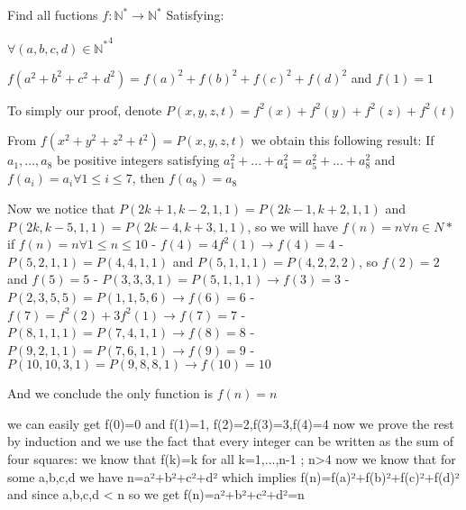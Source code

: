 \begin{solution}
	\begin{tcolorbox}Find all fuctions $ f: \mathbb{N^{*}} \longrightarrow \mathbb{N^*}$ Satisfying:

$ \forall (a,b,c,d) \in \mathbb{N^*}^4$

$ f(a^2 + b^2 + c^2 + d^2) = f(a)^2 + f(b)^2 + f(c)^2 + f(d)^2$ and $ f(1) = 1$\end{tcolorbox}

To simply our proof, denote $ P(x,y,z,t) = f^2(x) + f^2(y) + f^2(z) + f^2(t)$

From $ f(x^2 + y^2 + z^2 + t^2) = P(x,y,z,t)$ we obtain this following result:
If $ a_1,...,a_8$ be positive integers satisfying $ a_1^2 + ... + a_4^2 = a_5^2 + ... + a_8^2$ and $ f(a_i) = a_i \forall 1 \le i \le 7$, then $ f(a_8) = a_8$

Now we notice that $ P(2k + 1,k - 2,1,1) = P(2k - 1,k + 2,1,1)$ and $ P(2k,k - 5,1,1) = P(2k - 4,k + 3,1,1)$, so we will have $ f(n) = n \forall n \in N*$ if $ f(n) = n \forall 1 \le n \le 10$
- $ f(4) = 4f^2(1) \rightarrow f(4) = 4$
- $ P(5,2,1,1) = P(4,4,1,1)$ and $ P(5,1,1,1) = P(4,2,2,2)$, so $ f(2) = 2$ and $ f(5) = 5$
- $ P(3,3,3,1) = P(5,1,1,1) \rightarrow f(3) = 3$
- $ P(2,3,5,5) = P(1,1,5,6) \rightarrow f(6) = 6$
- $ f(7) = f^2(2) + 3f^2(1) \rightarrow f(7) = 7$
- $ P(8,1,1,1) = P(7,4,1,1) \rightarrow f(8) = 8$
- $ P(9,2,1,1) = P(7,6,1,1) \rightarrow f(9) = 9$
- $ P(10,10,3,1) = P(9,8,8,1) \rightarrow f(10) = 10$

And we conclude the only function is $ f(n) = n$
\end{solution}



\begin{solution}
	we can easily get f(0)=0 and f(1)=1, f(2)=2,f(3)=3,f(4)=4
now we prove the rest by induction and we use the fact that every integer can be written as the sum of four squares:
we know that f(k)=k for all k=1,...,n-1 ; n>4
now we know that for some a,b,c,d we have n=a²+b²+c²+d² which implies f(n)=f(a)²+f(b)²+f(c)²+f(d)²
and since a,b,c,d < n so we get f(n)=a²+b²+c²+d²=n
\end{solution}



